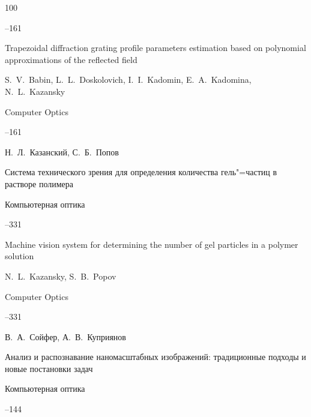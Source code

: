 \begin{thebibliography}{100}



--161

\misctransl

\paper Trapezoidal diffraction grating profile parameters estimation based on polynomial approximations of the reflected field

\by S.~V.~Babin, L.~L.~Doskolovich,  I.~I.~Kadomin, E.~A.~Kadomina, N.~L.~Kazansky 

\jour Computer Optics




--161




\by Н.~Л.~Казанский, С.~Б.~Попов

\paper Система технического зрения для определения количества гель"=частиц в растворе полимера

\jour Компьютерная оптика




--331

\misctransl

\paper Machine vision system for determining the number of gel particles in a polymer solution 

\by N.~L.~Kazansky, S.~B.~Popov

\jour Computer Optics




--331






\by В.~А.~Сойфер, А.~В.~Куприянов

\paper Анализ и распознавание наномасштабных изображений: традиционные подходы и новые постановки задач

\jour Компьютерная оптика




--144

\misctransl


\end{thebibliography}
